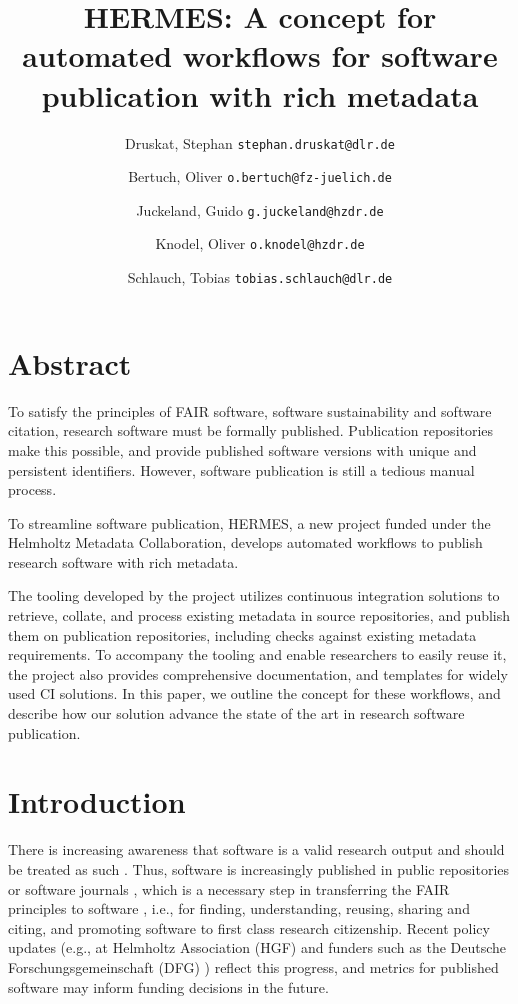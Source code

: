 \documentclass{article}
\title{HERMES: A concept for automated workflows for software publication with rich metadata}
\author{
Druskat, Stephan \texttt{stephan.druskat@dlr.de}\and
Bertuch, Oliver \texttt{o.bertuch@fz-juelich.de}\and
Juckeland, Guido \texttt{g.juckeland@hzdr.de}\and
Knodel, Oliver \texttt{o.knodel@hzdr.de}\and
Schlauch, Tobias \texttt{tobias.schlauch@dlr.de}
}
\begin{document}
\maketitle


\section{Abstract}\label{i5b0iuy}
To satisfy the principles of FAIR software, software sustainability and software citation, research software must be formally published. Publication repositories make this possible, and provide published software versions with unique and persistent identifiers. However, software publication is still a tedious manual process.

To streamline software publication, HERMES, a new project funded under the Helmholtz Metadata Collaboration, develops automated workflows to publish research software with rich metadata.

The tooling developed by the project utilizes continuous integration solutions to retrieve, collate, and process existing metadata in source repositories, and publish them on publication repositories, including checks against existing metadata requirements. To accompany the tooling and enable researchers to easily reuse it, the project also provides comprehensive documentation, and templates for widely used CI solutions. In this paper, we outline the concept for these workflows, and describe how our solution advance the state of the art in research software publication.



\section{Introduction}\label{np3hpza9k7f}
There is increasing awareness that software is a valid research output and should be treated as such \cite{11045035/YUM73BP7}. Thus, software is increasingly published in public repositories or software journals \cite{138880/CVGZJALP}, which is a necessary step in transferring the FAIR principles to software \cite{11045035/FNK2BYH3}, i.e., for finding, understanding, reusing, sharing and citing, and promoting software to first class research citizenship. Recent policy updates (e.g., at Helmholtz Association (HGF) \cite{11045035/N56QGRXT} and funders such as the Deutsche Forschungsgemeinschaft (DFG) \cite{11045035/YMQTEV42}) reflect this progress, and metrics for published software may inform funding decisions in the future.
\end{document}
